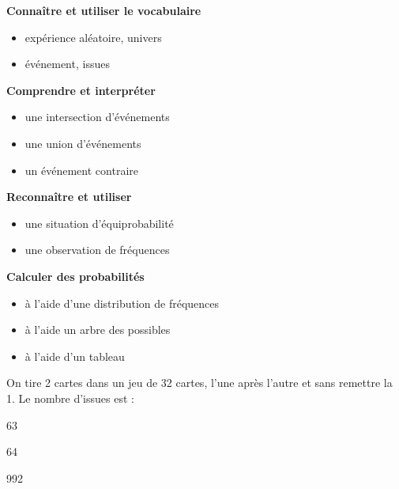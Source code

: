 
\begin{acquis}
\textcolor{G1}{\textbf{Connaître et utiliser le vocabulaire}}
\begin{itemize}
\item expérience aléatoire, univers 
\item événement, issues
\end{itemize}
\textcolor{G1}{\textbf{Comprendre et interpréter}}
\begin{itemize}
\item une intersection d'événements
\item une union d'événements
\item un événement contraire
\end{itemize}
\textcolor{G1}{\textbf{Reconnaître et utiliser}}
\begin{itemize}
\item une situation d'équiprobabilité
\item une observation de fréquences
\end{itemize}
\textcolor{G1}{\textbf{Calculer des probabilités}}
\begin{itemize}
\item à l'aide d'une distribution de fréquences
\item à l'aide un arbre des possibles
\item à l'aide d'un tableau
  \end{itemize}
\end{acquis}



\begin{QCM}
\begin{EnonceCommunQCM}
\end{EnonceCommunQCM}
\begin{GroupeQCM}
\begin{exercice}On tire 2 cartes dans un jeu de 32 cartes, l'une après l'autre et sans remettre la 1\iere. Le nombre d'issues est :
\begin{ChoixQCM}{4}
\item 63
\item 64
\item 992
\item {}
\end{ChoixQCM}
 \begin{corrige}
    \end{corrige}
\end{exercice}

\end{GroupeQCM}
\end{QCM}


